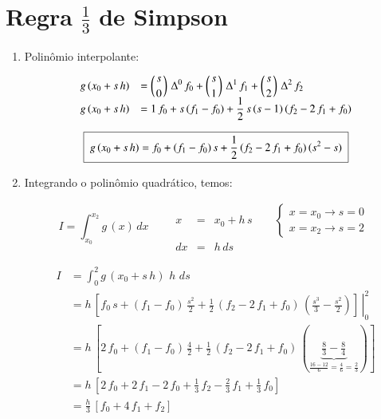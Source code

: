 \section{Regra $\frac{1}{3}$ de Simpson}

\begin{enumerate}
 \item Polinômio interpolante:

\[
 \begin{array}{ll}
  g\,(x_0 + s\,h) & = \displaystyle \left(s \atop 0\right) \, \Delta^0 \, f_0 + \left(s \atop 1\right) \, \Delta^1 \, f_1 + \left(s \atop 2\right) \, \Delta^2 \, f_2 \\
  g\,(x_0 + s\,h) & = 1 \, f_0 + s\,(f_1 - f_0) + \displaystyle \frac{1}{2} \, s \, (s - 1) \, (f_2 - 2\,f_1 + f_0)
 \end{array}
\]

\[
 \quadricular{ g\,(x_0 + s\,h) = f_0 + (f_1 - f_0)\,s + \displaystyle \frac{1}{2} \, (f_2 - 2\,f_1 + f_0) \, (s^2 - s) }
\]

\item Integrando o polinômio quadrático, temos:

\[
 I = \int_{x_0}^{x_2} g\,(x) \, dx
 \qquad
 \begin{array}{rcl}
  x & = & x_0 + h\,s \qquad 
  \left\{
  \begin{array}{l}
   x = x_0 \rightarrow s = 0 \\
   x = x_2 \rightarrow s = 2
  \end{array}
  \right.
  \\
  dx & = & h\,ds
 \end{array}
\]

\[
 \begin{array}{ll}
  I & = \displaystyle \int_0^2 g\,(x_0 + s\,h) \, \, h \, \, ds \\
    & = \left. h \, \left[ f_0\,s + (f_1 - f_0) \, \displaystyle \frac{s^2}{2} + \frac{1}{2} \, (f_2 - 2\,f_1 + f_0)\,\left(\frac{s^3}{3} - \frac{s^2}{2}\right) \right] \, \right|_0^2 \\
    & = h \, \left[ 2\,f_0 + (f_1 - f_0) \, \displaystyle \frac{4}{2} + \frac{1}{2} \, (f_2 - 2\,f_1 + f_0) \, \left( \underbrace{\frac{8}{3} - \frac{8}{4}}_{\frac{16 - 12}{6} = \frac{4}{6} = \frac{2}{3}} \right) \right] \\
    & = h \, \left[ 2\,f_0 + 2\,f_1 - 2\,f_0 + \displaystyle \frac{1}{3}\,f_2 - \frac{2}{3}\,f_1 + \frac{1}{3}\,f_0 \right] \\
    & = \displaystyle \frac{h}{3} \, \left[ f_0 + 4\,f_1 + f_2 \right]
 \end{array}
\]


\end{enumerate}

